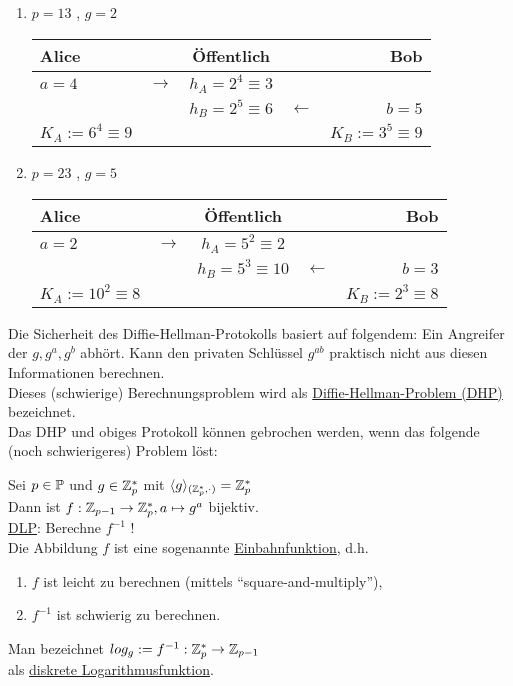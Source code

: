 \documentclass{../../meta/tudscript}
\begin{document}
			\begin{enumerate}
				\item
					$p=13$ , $g=2$\\
					\begin{tabular}{ l c c c r }
						Alice & & Öffentlich & & Bob \\
						\hline
						$a = 4$ & $\rightarrow$ & $h_A = 2^4 \equiv 3$ & & \\
						& & $h_B = 2^5 \equiv 6$ & $\leftarrow$ & $b = 5$ \\
						$K_A := 6^4 \equiv 9$ & & & & $K_B := 3^5 \equiv 9$
					\end{tabular}
				\item
					$p=23$ , $g=5$\\
					\begin{tabular}{ l c c c r }
						Alice & & Öffentlich & & Bob \\
						\hline
						$a = 2$ & $\rightarrow$ & $h_A = 5^2 \equiv 2$ & & \\
						& & $h_B = 5^3 \equiv 10$ & $\leftarrow$ & $b = 3$ \\
						$K_A := 10^2 \equiv 8$ & & & & $K_B := 2^3 \equiv 8$
					\end{tabular}
			\end{enumerate}
		
			Die Sicherheit des Diffie-Hellman-Protokolls basiert auf folgendem: Ein Angreifer der $g, g^a, g^b$ abhört. Kann den privaten Schlüssel $g^{ab}$ praktisch nicht aus diesen Informationen berechnen. \\
			Dieses (schwierige) Berechnungsproblem wird als \underline{Diffie-Hellman-Problem (DHP)} bezeichnet. \\
			Das DHP und obiges Protokoll können gebrochen werden, wenn das folgende (noch schwierigeres) Problem löst:
			
			Sei $p \in \mathbb{P}$ und $g \in \mathbb{Z}^*_p$ mit $\langle g \rangle_{(\mathbb{Z}^*_p, \cdot)} = \mathbb{Z}^*_p$ \\
			Dann ist $f : \mathbb{Z}_{p-1} \rightarrow \mathbb{Z}^*_p, a \mapsto g^a$ bijektiv. \\
			\underline{DLP}: Berechne $f^{-1}$ ! \\
			
			Die Abbildung $f$ ist eine sogenannte \underline{Einbahnfunktion}, d.h.
			\begin{enumerate}
				\item $f$ ist leicht zu berechnen (mittels ``square-and-multiply''),
				\item $f^{-1}$ ist schwierig zu berechnen.
			\end{enumerate}
			Man bezeichnet $log_g := f^{-1} : \mathbb{Z}^*_p \rightarrow \mathbb{Z}_{p-1}$ \\
			als \underline{diskrete Logarithmusfunktion}.
\end{document}
